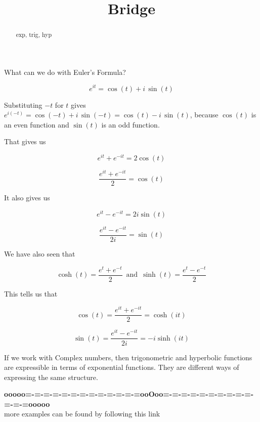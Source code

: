 \documentclass{ximera}
\title{Bridge}
\begin{document}
\begin{abstract}
exp, trig, hyp
\end{abstract}
\maketitle





What can we do with Euler's Formula?



\[ e^{i t} = \cos(t) + i \, \sin(t) \]

Substituting $-t$ for $t$ gives $e^{i (-t)} = \cos(-t) + i \, \sin(-t) = \cos(t) - i \, \sin(t)$, because $\cos(t)$ is an even function and $\sin(t)$ is an odd function.



That gives us 

\[   e^{i t}  + e^{-i t} = 2 \cos(t)    \]


\[   \frac{e^{i t}  + e^{-i t}}{2} = \cos(t)    \]


It also gives us 



\[   e^{i t}  - e^{-i t} = 2 i \sin(t)    \]


\[   \frac{e^{i t}  - e^{-i t}}{2 i} = \sin(t)    \]





We have also seen that 


\[  \cosh(t)  = \frac{e^t + e^{-t}}{2}      \,   \text{ and } \,  \sinh(t)  = \frac{e^t - e^{-t}}{2}     \]



This tells us that 

\[  \cos(t) =  \frac{e^{i t} + e^{-i t}}{2} = \cosh(i t)      \]




\[  \sin(t) =  \frac{e^{i t} - e^{-i t}}{2 i} = -i \sinh(i t)      \]






If we work with Complex numbers, then trigonometric and hyperbolic functions are expressible in terms of exponential functions.  They are different ways of expressing the same structure.






















\begin{center}
\textbf{\textcolor{green!50!black}{ooooo=-=-=-=-=-=-=-=-=-=-=-=-=ooOoo=-=-=-=-=-=-=-=-=-=-=-=-=ooooo}} \\

more examples can be found by following this link\\ 

\end{center}
\end{document}
